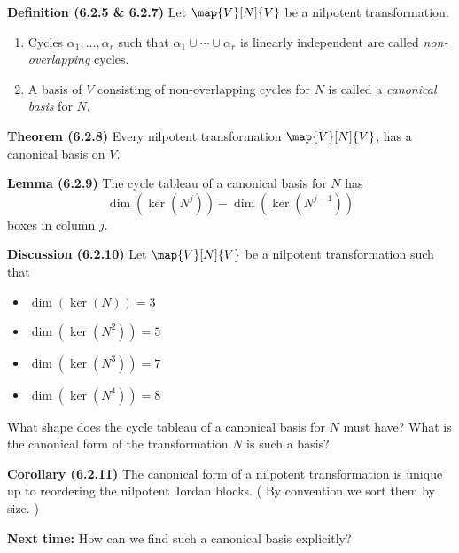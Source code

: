 \documentclass[letterpaper, 10pt]{article}
\begin{document}
\vspace{300pt}
\lb
\textbf{Definition (6.2.5 \& 6.2.7)}
\lb
Let $\map{V}[N]{V}$ be a nilpotent transformation.
\begin{enumerate}
    \item Cycles $α_1, \ldots, α_r$ such that $ α_1 \cup \cdots \cup α_r $ is linearly independent are called \emph{non-overlapping} cycles.
    \item A basis of $V$ consisting of non-overlapping cycles for $N$ is called
        a \emph{canonical basis} for $N$.
\end{enumerate}


\newpage
\lb
\textbf{Theorem (6.2.8)}
\lb
Every nilpotent transformation $\map{V}[N]{V}$, has a canonical basis on $V$.



\vspace{40pt}
\lb
\textbf{Lemma (6.2.9)}
\lb
The cycle tableau of a canonical basis for $N$ has
\[ \dim(\ker(N^j)) - \dim(\ker(N^{j-1})) \]
boxes in column $j$.

\vspace{40pt}
\lb
\textbf{Discussion (6.2.10)}
\lb
Let $\map{V}[N]{V}$ be a nilpotent transformation such that
\begin{itemize}
    \item $\dim(\ker(N)) = 3$
    \item $\dim(\ker(N^2)) = 5$
    \item $\dim(\ker(N^3)) = 7$
    \item $\dim(\ker(N^4)) = 8$
\end{itemize}
What shape does the cycle tableau of a canonical basis for $N$ must have?
What is the canonical form of the transformation $N$ is such a basis?

\vspace{200pt}
\lb
\textbf{Corollary (6.2.11)}
\lb
The canonical form of a nilpotent transformation is unique up to reordering
the nilpotent Jordan blocks. ( By convention we sort them by size. )





\vspace{40pt}
\lb
\textbf{Next time: } How can we find such a canonical basis explicitly?
\end{document}

